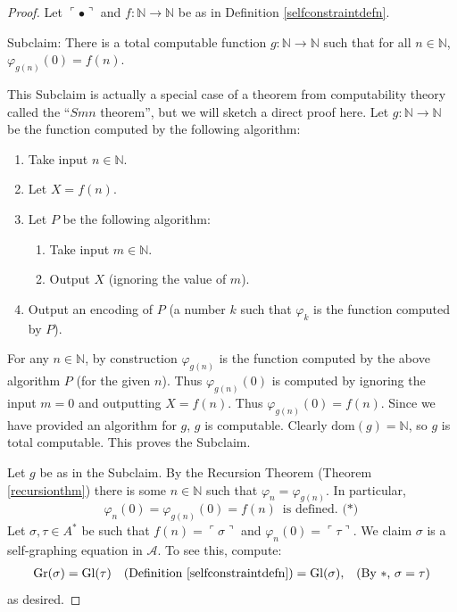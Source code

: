 \documentclass[table, svgnames, dvipsnames, letterpaper, 11pt]{report}
\theoremstyle{remark}
\def\\{}%
\begin{document}
\begin{proof}
  Let $\ulcorner\bullet\urcorner$ and $f:\mathbb N\to\mathbb N$ be as in
  Definition \ref{selfconstraintdefn}.

  Subclaim: There is a total computable function $g:\mathbb N\to\mathbb N$
  such that for all $n\in\mathbb N$, $\varphi_{g(n)}(0)=f(n)$.

  This Subclaim is actually a special case of a theorem
  from computability theory called
  the ``$Smn$ theorem'', but we will sketch a direct proof here.
  Let $g:\mathbb N\to\mathbb N$ be the function computed by the following
  algorithm:
  \begin{enumerate}
    \item Take input $n\in\mathbb N$.
    \item Let $X=f(n)$.
    \item Let $P$ be the following algorithm:
    \begin{enumerate}
      \item Take input $m\in\mathbb N$.
      \item Output $X$ (ignoring the value of $m$).
    \end{enumerate}
    \item Output an encoding of $P$ (a number $k$ such that
      $\varphi_k$ is the function computed by $P$).
  \end{enumerate}
  For any $n\in\mathbb N$, by construction $\varphi_{g(n)}$ is the
  function computed by the above algorithm $P$ (for the given $n$).
  Thus $\varphi_{g(n)}(0)$ is computed by ignoring the input $m=0$
  and outputting $X=f(n)$. Thus $\varphi_{g(n)}(0)=f(n)$.
  Since we have provided an algorithm for $g$, $g$ is computable.
  Clearly $\mathrm{dom}(g)=\mathbb N$, so $g$ is total computable.
  This proves the Subclaim.

  Let $g$ be as in the Subclaim.
  By the Recursion Theorem (Theorem \ref{recursionthm}) there is some
  $n\in\mathbb N$ such that $\varphi_n=\varphi_{g(n)}$.
  In particular,
  \[
    \varphi_n(0) = \varphi_{g(n)}(0) = f(n) \mbox{ is defined. ($*$)}
  \]
  Let $\sigma,\tau\in A^*$ be such that $f(n)=\ulcorner\sigma\urcorner$
  and $\varphi_n(0)=\ulcorner\tau\urcorner$.
  We claim $\sigma$ is a self-graphing equation in $\mathcal A$.
  To see this,
  compute:
  \begin{align*}
    \mathrm{Gr}(\sigma)
      &= \mathrm{Gl}(\tau)
        &\mbox{(Definition \ref{selfconstraintdefn})}\\
      &= \mathrm{Gl}(\sigma),
        &\mbox{(By $*$, $\sigma=\tau$)}
  \end{align*}
  as desired.
\end{proof}
\end{document}
